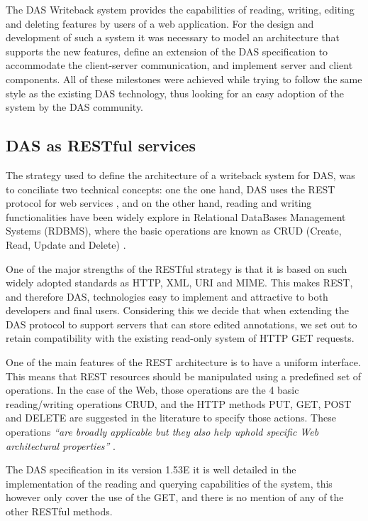 The DAS Writeback system provides the capabilities of reading, writing, editing and deleting features by users of a web application. For the design and development of such a system it was necessary to model an architecture that supports the new features, define an extension of the DAS specification to accommodate the client-server communication, and implement server and client components. All of these milestones were achieved while trying to follow the same style as the existing DAS technology, thus looking for an easy adoption of the system by the DAS community.

\subsection{DAS as RESTful services}
The strategy used to define the architecture of a writeback system for DAS, was to conciliate two technical concepts: one the one hand, DAS uses the REST protocol for web services \cite{PRL2007}, and on the other hand, reading and writing functionalities have been widely explore in Relational DataBases Management Systems (RDBMS), where the basic operations are  known as CRUD (Create, Read, Update and Delete) \cite{KIL1990}.

One of the major strengths of the RESTful strategy is that it is based on such widely adopted standards as HTTP, XML, URI and MIME. This makes REST, and therefore DAS, technologies easy to implement and attractive to both developers and final users. Considering this we decide that when extending the DAS protocol to support servers that can store edited annotations, we set out to retain compatibility with the existing read-only system of HTTP GET requests. 

One of the main features of the REST architecture is to have a uniform interface. This means that REST resources should be manipulated using a predefined set of operations. In the case of the Web, those operations are the 4 basic reading/writing operations CRUD, and the HTTP methods PUT, GET, POST and DELETE are suggested in the literature to specify those actions. These operations \textit{``are broadly applicable but they also help uphold specific Web architectural properties''} \cite{VIN2008}.

The DAS specification in its version 1.53E it is well detailed in the implementation of the reading and querying capabilities of the system, this however only cover the use of the GET, and there is no mention of any of the other RESTful methods.

